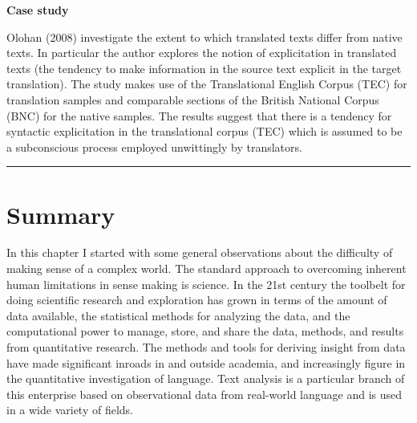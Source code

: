 \documentclass[
  letterpaper,
]{latex/krantz}
\begin{document}
\begin{tcolorbox}[enhanced jigsaw, colframe=quarto-callout-caution-color-frame, titlerule=0mm, coltitle=black, colback=white, opacitybacktitle=0.6, colbacktitle=quarto-callout-caution-color!10!white, left=2mm, arc=.35mm, leftrule=.75mm, rightrule=.15mm, bottomtitle=1mm, toptitle=1mm, breakable, bottomrule=.15mm, title=\textcolor{quarto-callout-caution-color}{\faFire}\hspace{0.5em}{Caution}, toprule=.15mm, opacityback=0]

\textbf{Case study}

Olohan (2008) investigate the extent to which translated texts differ
from native texts. In particular the author explores the notion of
explicitation in translated texts (the tendency to make information in
the source text explicit in the target translation). The study makes use
of the Translational English Corpus (TEC) for translation samples and
comparable sections of the British National Corpus (BNC) for the native
samples. The results suggest that there is a tendency for syntactic
explicitation in the translational corpus (TEC) which is assumed to be a
subconscious process employed unwittingly by translators.

\end{tcolorbox}

\begin{center}\rule{0.5\linewidth}{0.5pt}\end{center}

\hypertarget{summary-1}{%
\section*{Summary}\label{summary-1}}


In this chapter I started with some general observations about the
difficulty of making sense of a complex world. The standard approach to
overcoming inherent human limitations in sense making is science. In the
21st century the toolbelt for doing scientific research and exploration
has grown in terms of the amount of data available, the statistical
methods for analyzing the data, and the computational power to manage,
store, and share the data, methods, and results from quantitative
research. The methods and tools for deriving insight from data have made
significant inroads in and outside academia, and increasingly figure in
the quantitative investigation of language. Text analysis is a
particular branch of this enterprise based on observational data from
real-world language and is used in a wide variety of fields.
\end{document}
